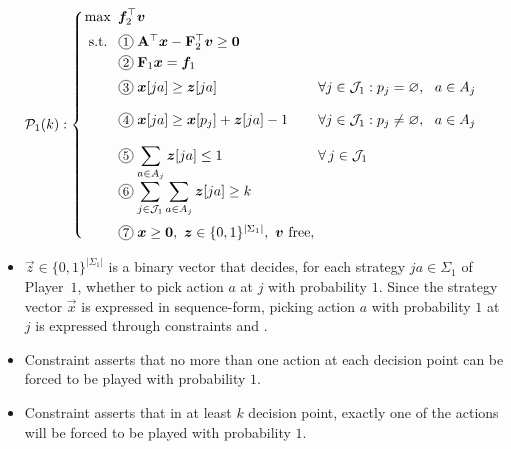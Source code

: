 \documentclass{homework}
\begin{document}
\begin{equation}\label{eq:controlling ilp pl1}
    \arraycolsep=1.0pt
    \mathcal{P}_1(k) : \mleft\lbrace\begin{array}{l}
        \displaystyle\max~ \vec{f}_2^\top \vec{v}\\[2mm]
        \hspace{1mm}\text{\normalfont s.t.}~~ 
        \arraycolsep=1.4pt
        \begin{array}[t]{lll}
            \circled{1}   & \mat{A}^\top \vec{x} - \mat{F}_2^\top \vec{v} \ge \vec{0} \\[1mm]
            \circled{2}   & \mat{F}_1\vec{x}                      = \vec{f}_1 \\[2mm]
            \circled{3}   & \vec{x}[ja] \ge \vec{z}[ja] & \forall j\in\cJ_1: p_j = \emptyseq,~~a\in A_j\\[4mm]
            \circled{4}   & \vec{x}[ja] \ge \vec{x}[p_j] + \vec{z}[ja] - 1 & \forall j\in\cJ_1: p_j \neq \emptyseq,~~a\in A_j\\[4mm]
            \circled{5}   & \displaystyle\sum_{a\in A_j} \vec{z}[ja] \le 1  & \forall\,j\in\cJ_1\\[4mm]
            \circled{6}   & \displaystyle\sum_{j\in \cJ_1} \sum_{a\in A_j} \vec{z}[ja]\ge k\\[6mm]
            \circled{7}   & \vec{x} \ge \vec{0},~\vec{z}\in\{0,1\}^{|\Sigma_1|},~\vec{v}~\text{free},
        \end{array} %
    \end{array}\mright.
\end{equation}
\begin{itemize}
    \item $\vec{z} \in \{0,1\}^{|\Sigma_1|}$ is a binary vector that decides, for each strategy $ja \in \Sigma_1$ of Player~$1$, whether to pick action $a$ at $j$ with probability $1$. Since the strategy vector $\vec{x}$ is expressed in sequence-form, picking action $a$ with probability $1$ at $j$ is expressed through constraints  and .
    \item Constraint  asserts that no more than one action at each decision point can be forced to be played with probability $1$.
    \item Constraint  asserts that in at least $k$ decision point, exactly one of the actions will be forced to be played with probability $1$.
\end{itemize}
\end{document}
